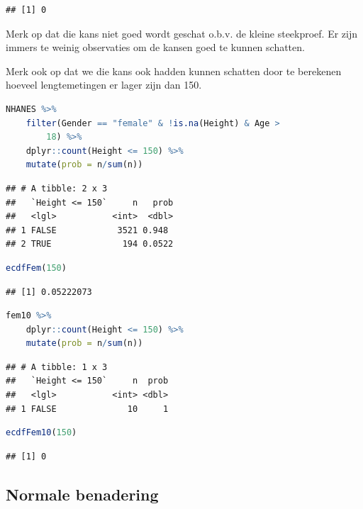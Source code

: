 \documentclass[
  12pt,dutch,coursenotes]{book}
\begin{document}
\begin{lstlisting}
## [1] 0
\end{lstlisting}

Merk op dat die kans niet goed wordt geschat o.b.v. de kleine steekproef. Er zijn immers te weinig observaties om de kansen goed te kunnen schatten.

Merk ook op dat we die kans ook hadden kunnen schatten door te berekenen hoeveel lengtemetingen er lager zijn dan 150.

\begin{lstlisting}[language=R]
NHANES %>%
    filter(Gender == "female" & !is.na(Height) & Age >
        18) %>%
    dplyr::count(Height <= 150) %>%
    mutate(prob = n/sum(n))
\end{lstlisting}

\begin{lstlisting}
## # A tibble: 2 x 3
##   `Height <= 150`     n   prob
##   <lgl>           <int>  <dbl>
## 1 FALSE            3521 0.948 
## 2 TRUE              194 0.0522
\end{lstlisting}

\begin{lstlisting}[language=R]
ecdfFem(150)
\end{lstlisting}

\begin{lstlisting}
## [1] 0.05222073
\end{lstlisting}

\begin{lstlisting}[language=R]
fem10 %>%
    dplyr::count(Height <= 150) %>%
    mutate(prob = n/sum(n))
\end{lstlisting}

\begin{lstlisting}
## # A tibble: 1 x 3
##   `Height <= 150`     n  prob
##   <lgl>           <int> <dbl>
## 1 FALSE              10     1
\end{lstlisting}

\begin{lstlisting}[language=R]
ecdfFem10(150)
\end{lstlisting}

\begin{lstlisting}
## [1] 0
\end{lstlisting}

\hypertarget{normale-benadering}{%
\subsection{Normale benadering}\label{normale-benadering}}
\end{document}
